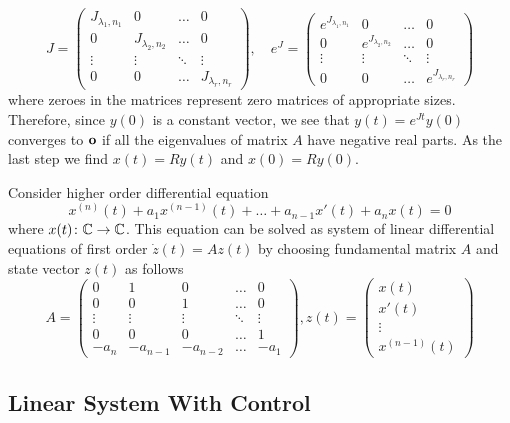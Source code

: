 \begin{equation*}
	J=
	\begin{pmatrix}
		J_{\lambda_1,n_1} & 0 & \ldots & 0 \\
		0 & J_{\lambda_2,n_2} & \ldots & 0 \\
		\vdots & \vdots & \ddots & \vdots \\
		0 & 0 & \ldots & J_{\lambda_r,n_r}
	\end{pmatrix},
	\quad 
	e^J=
	\begin{pmatrix}
		e^{J_{\lambda_1,n_1}} & 0 & \ldots & 0 \\
		0 & e^{J_{\lambda_2,n_2}} & \ldots & 0 \\
		\vdots & \vdots & \ddots & \vdots \\
		0 & 0 & \ldots & e^{J_{\lambda_r,n_r}}
	\end{pmatrix}
\end{equation*}
where zeroes in the matrices represent zero matrices of appropriate sizes. Therefore, since $y(0)$ is a constant vector, we see that $y(t)=e^{Jt}y(0)$ converges to $\textbf{o}$ if all the eigenvalues of matrix $A$ have negative real parts. As the last step we find $x(t)=Ry(t)$ and $x(0)=Ry(0)$.

\begin{example}
	Consider higher order differential equation $$x^{(n)}(t)+a_1x^{(n-1)}(t)+\ldots+a_{n-1}x'(t)+a_nx(t)=0$$ where $x(t)\colon\mathbb{C}\rightarrow\mathbb{C}$. This equation can be solved as system of linear differential equations of first order $\dot{z}(t)=Az(t)$ by choosing fundamental matrix $A$ and state vector $z(t)$ as follows
	\begin{equation*}
		A=
		\begin{pmatrix}
			0 & 1 & 0 & \ldots & 0 \\
			0 & 0 & 1 & \ldots & 0 \\
			\vdots & \vdots & \vdots & \ddots & \vdots \\
			0 & 0 & 0 & \ldots & 1 \\
			-a_n & -a_{n-1} & -a_{n-2} & \ldots & -a_1
		\end{pmatrix}
		, z(t)=
		\begin{pmatrix}
			x(t) \\
			x'(t) \\
			\vdots \\
			x^{(n-1)}(t)
		\end{pmatrix}
	\end{equation*}
\end{example}

\subsection{Linear System With Control}

